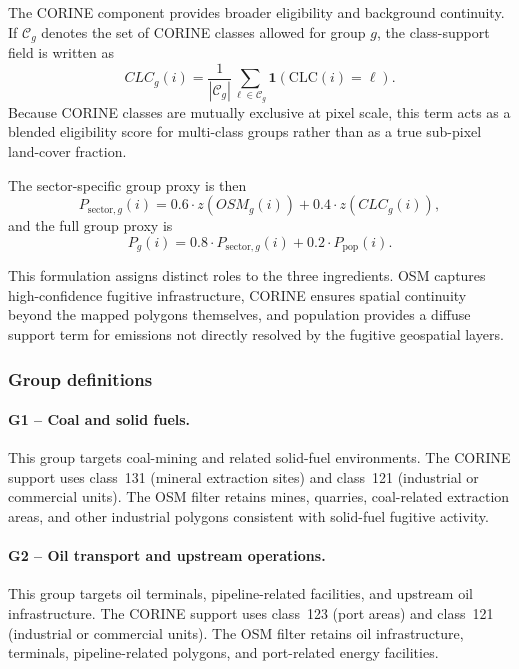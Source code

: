 The CORINE component provides broader eligibility and background
continuity. If $\mathcal{C}_g$ denotes the set of CORINE classes allowed
for group $g$, the class-support field is written as
\begin{equation}
  CLC_g(i) =
  \frac{1}{|\mathcal{C}_g|}
  \sum_{\ell \in \mathcal{C}_g}
  \mathbf{1}\!\left(\mathrm{CLC}(i)=\ell\right).
\end{equation}
Because CORINE classes are mutually exclusive at pixel scale, this term
acts as a blended eligibility score for multi-class groups rather than
as a true sub-pixel land-cover fraction.

The sector-specific group proxy is then
\begin{equation}
  P_{\mathrm{sector},g}(i) =
  0.6 \cdot z\!\left(OSM_g(i)\right)
  + 0.4 \cdot z\!\left(CLC_g(i)\right),
\end{equation}
and the full group proxy is
\begin{equation}
  P_g(i) =
  0.8 \cdot P_{\mathrm{sector},g}(i)
  + 0.2 \cdot P_{\mathrm{pop}}(i).
\end{equation}

This formulation assigns distinct roles to the three ingredients. OSM
captures high-confidence fugitive infrastructure, CORINE ensures spatial
continuity beyond the mapped polygons themselves, and population
provides a diffuse support term for emissions not directly resolved by
the fugitive geospatial layers.

\subsubsection{Group definitions}

\paragraph{G1 -- Coal and solid fuels.}
This group targets coal-mining and related solid-fuel environments. The
CORINE support uses class~131 (mineral extraction sites) and class~121
(industrial or commercial units). The OSM filter retains mines,
quarries, coal-related extraction areas, and other industrial polygons
consistent with solid-fuel fugitive activity.

\paragraph{G2 -- Oil transport and upstream operations.}
This group targets oil terminals, pipeline-related facilities, and
upstream oil infrastructure. The CORINE support uses class~123 (port
areas) and class~121 (industrial or commercial units). The OSM filter
retains oil infrastructure, terminals, pipeline-related polygons, and
port-related energy facilities.

